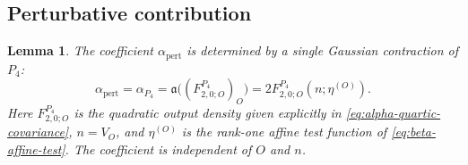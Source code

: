 \documentclass[11pt]{article}
\numberwithin{equation}{section}
\newtheorem{lemma}[theorem]{Lemma}
\theoremstyle{definition}
\theoremstyle{plain}
\begin{document}


\subsection{Perturbative contribution}

 \begin{lemma}
\label{lem:alpha-quartic-transfer}
The coefficient $\alpha_{\mathrm{pert}}$ is determined by a single
Gaussian contraction of $P_4$:
\begin{equation}
 \alpha_{\mathrm{pert}}=\alpha_{P_4}
             =\mathfrak a\bigl((F_{2,0;O}^{P_4})_O\bigr)
             =2F_{2,0;O}^{P_4}(n;\eta^{(O)}).
 \label{eq:alpha-quartic-transfer}
\end{equation}
Here $F_{2,0;O}^{P_4}$ is the quadratic output density given
explicitly in \eqref{eq:alpha-quartic-covariance}, $n=V_O$,
and $\eta^{(O)}$ is the rank-one affine test function of
\eqref{eq:beta-affine-test}.  The coefficient is independent
of $O$ and $n$.
\end{lemma}
\end{document}
